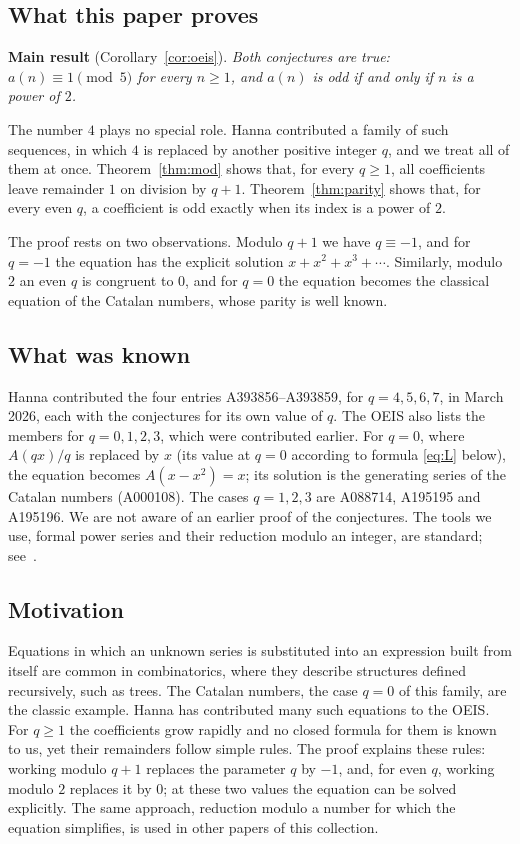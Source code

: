\documentclass[11pt,a4paper]{article}
\theoremstyle{definition}
\theoremstyle{remark}
\begin{document}
\subsection{What this paper proves}
\textbf{Main result} (Corollary~\ref{cor:oeis}). \emph{Both conjectures are true: $a(n)\equiv1\pmod{5}$ for every $n\ge1$, and $a(n)$ is odd if and only if $n$ is a power of $2$.}

The number $4$ plays no special role. Hanna contributed a family of such sequences, in which
$4$ is replaced by another positive integer $q$, and we treat all of them at once.
Theorem~\ref{thm:mod} shows that, for every $q\ge1$, all coefficients leave remainder $1$ on division by $q+1$.
Theorem~\ref{thm:parity} shows that, for every even $q$, a coefficient is odd exactly when its index is a power of $2$.

The proof rests on two observations. Modulo $q+1$ we have $q\equiv-1$, and for $q=-1$ the equation has the
explicit solution $x+x^2+x^3+\cdots$. Similarly, modulo $2$ an even $q$ is congruent to $0$, and for $q=0$ the
equation becomes the classical equation of the Catalan numbers, whose parity is well known.

\subsection{What was known}
Hanna contributed the four entries A393856--A393859, for $q=4,5,6,7$, in March 2026, each with the conjectures for its
own value of $q$. The OEIS also lists the members for $q=0,1,2,3$, which were contributed earlier. For $q=0$, where
$A(qx)/q$ is replaced by $x$ (its value at $q=0$ according to formula \eqref{eq:L} below), the equation becomes
$A(x-x^2)=x$; its solution is the generating series of the Catalan numbers (A000108). The cases $q=1,2,3$ are
A088714, A195195 and A195196. We are not aware of an earlier proof of the conjectures. The tools we use, formal power
series and their reduction modulo an integer, are standard; see~\cite{niven,stanley}.

\subsection{Motivation}
Equations in which an unknown series is substituted into an expression built from itself are common in
combinatorics, where they describe structures defined recursively, such as trees. The Catalan numbers, the case $q=0$
of this family, are the classic example. Hanna has contributed many such equations to the OEIS. For $q\ge1$ the
coefficients grow rapidly and no closed formula for them is known to us, yet their remainders follow simple rules. The
proof explains these rules: working modulo $q+1$ replaces the parameter $q$ by $-1$, and, for even $q$, working modulo
$2$ replaces it by $0$; at these two values the equation can be solved explicitly. The same approach, reduction modulo
a number for which the equation simplifies, is used in other papers of this collection.
\end{document}
